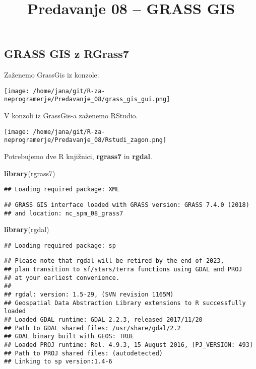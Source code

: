\documentclass[]{article}
\title{Predavanje 08 -- GRASS GIS}
\author{}
\date{\vspace{-2.5em}}
\newenvironment{Shaded}{\begin{snugshade}}{\end{snugshade}}
\newcommand{\KeywordTok}[1]{\textcolor[rgb]{0.13,0.29,0.53}{\textbf{#1}}}
\newcommand{\NormalTok}[1]{#1}
\begin{document}
\maketitle

\subsection{GRASS GIS z RGrass7}\label{grass-gis-z-rgrass7}

Zaženemo GrassGis iz konzole:

\texttt{[image: /home/jana/git/R-za-neprogramerje/Predavanje\_08/grass\_gis\_gui.png]}

V konzoli iz GrassGis-a zaženemo RStudio.

\texttt{[image: /home/jana/git/R-za-neprogramerje/Predavanje\_08/Rstudi\_zagon.png]}

Potrebujemo dve R knjižnici, \textbf{rgrass7} in \textbf{rgdal}.

\begin{Shaded}
\begin{Highlighting}[]
\KeywordTok{library}\NormalTok{(rgrass7)}
\end{Highlighting}
\end{Shaded}

\begin{verbatim}
## Loading required package: XML
\end{verbatim}

\begin{verbatim}
## GRASS GIS interface loaded with GRASS version: GRASS 7.4.0 (2018)
## and location: nc_spm_08_grass7
\end{verbatim}

\begin{Shaded}
\begin{Highlighting}[]
\KeywordTok{library}\NormalTok{(rgdal)}
\end{Highlighting}
\end{Shaded}

\begin{verbatim}
## Loading required package: sp
\end{verbatim}

\begin{verbatim}
## Please note that rgdal will be retired by the end of 2023,
## plan transition to sf/stars/terra functions using GDAL and PROJ
## at your earliest convenience.
## 
## rgdal: version: 1.5-29, (SVN revision 1165M)
## Geospatial Data Abstraction Library extensions to R successfully loaded
## Loaded GDAL runtime: GDAL 2.2.3, released 2017/11/20
## Path to GDAL shared files: /usr/share/gdal/2.2
## GDAL binary built with GEOS: TRUE 
## Loaded PROJ runtime: Rel. 4.9.3, 15 August 2016, [PJ_VERSION: 493]
## Path to PROJ shared files: (autodetected)
## Linking to sp version:1.4-6
\end{verbatim}
\end{document}
